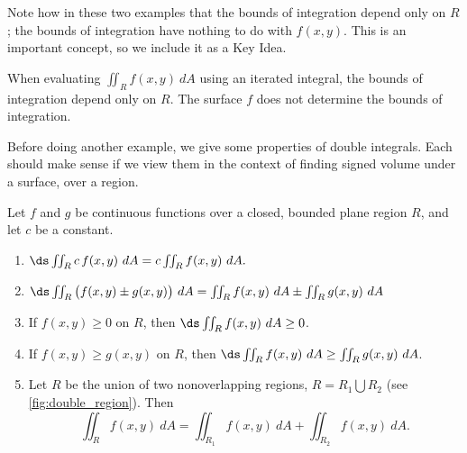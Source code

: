 Note how in these two examples that the bounds of integration depend only on $R$; the bounds of integration have nothing to do with $f(x,y)$. This is an important concept, so we include it  as a Key Idea.

{When evaluating $\iint_Rf(x,y)\ dA$ using an iterated integral, the bounds of integration depend only on $R$. The surface $f$ does not determine the bounds of integration.
}

Before doing another example, we give some properties of double integrals. Each should make sense if we view them in the context of finding signed volume under a surface, over a region.

{Let $f$ and $g$ be continuous functions over a closed, bounded plane region $R$, and let $c$ be a constant.
\begin{enumerate}
	\item $\ds \iint_Rc\,f(x,y)\ dA = c\iint_Rf(x,y)\ dA.$
	\item	$\ds \iint_R \big(f(x,y)\pm g(x,y)\big)\ dA = \iint_R f(x,y)\ dA \pm \iint_R g(x,y)\ dA $
	\item	If $f(x,y)\geq 0$ on $R$, then $\ds \iint_R f(x,y)\ dA\geq 0$.
	\item	If $f(x,y)\geq g(x,y)$ on $R$, then $\ds \iint_R f(x,y)\ dA\geq \iint_R g(x,y)\ dA$.
	\item \label{thm:double_prop_regions}	Let $R$ be the union of two nonoverlapping regions, $R = R_1\bigcup R_2$ (see \autoref{fig:double_region}). Then 
	$$\iint_R f(x,y)\ dA = \iint_{R_1}f(x,y)\ dA+ \iint_{R_2}f(x,y)\ dA.$$
\end{enumerate}}


